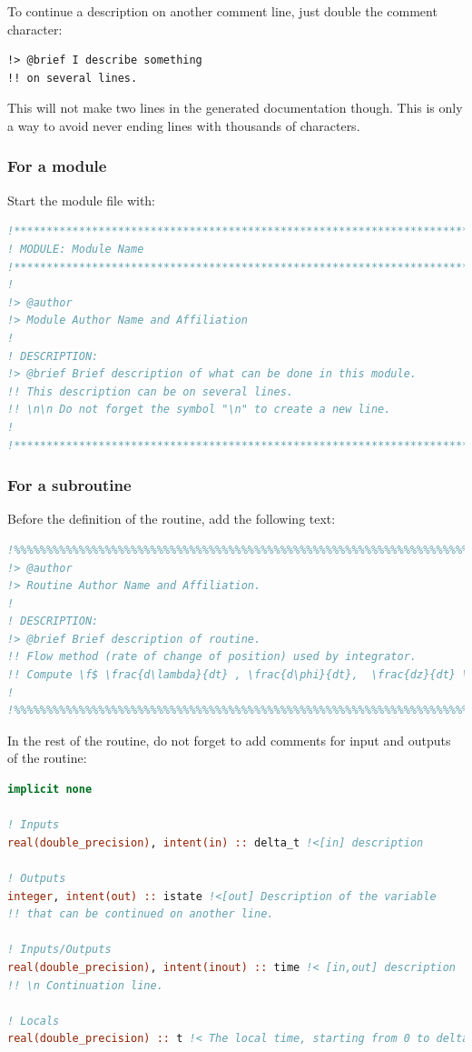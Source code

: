 \documentclass[english,a4paper,twoside]{article}
\begin{document}
To continue a description on another comment line, just double the comment character:
\begin{verbatim}
!> @brief I describe something
!! on several lines.
\end{verbatim}

\begin{remarque}
This will not make two lines in the generated documentation though. This is only a way to avoid never ending lines with thousands of characters.
\end{remarque}


\subsubsection{For a module}
Start the module file with:
\begin{lstlisting}[language=Fortran]
!******************************************************************************
! MODULE: Module Name
!******************************************************************************
!
!> @author
!> Module Author Name and Affiliation
!
! DESCRIPTION: 
!> @brief Brief description of what can be done in this module. 
!! This description can be on several lines. 
!! \n\n Do not forget the symbol "\n" to create a new line.
!
!******************************************************************************
\end{lstlisting}

\subsubsection{For a subroutine}
Before the definition of the routine, add the following text:
\begin{lstlisting}[language=Fortran]
!%%%%%%%%%%%%%%%%%%%%%%%%%%%%%%%%%%%%%%%%%%%%%%%%%%%%%%%%%%%%%%%%%%%%%%%%%%%
!> @author 
!> Routine Author Name and Affiliation.
!
! DESCRIPTION: 
!> @brief Brief description of routine. 
!! Flow method (rate of change of position) used by integrator.
!! Compute \f$ \frac{d\lambda}{dt} , \frac{d\phi}{dt},  \frac{dz}{dt} \f$ }
!
!%%%%%%%%%%%%%%%%%%%%%%%%%%%%%%%%%%%%%%%%%%%%%%%%%%%%%%%%%%%%%%%%%%%%%%%%%%% 
\end{lstlisting}

In the rest of the routine, do not forget to add comments for input and outputs of the routine: 
\begin{lstlisting}[language=Fortran]
implicit none

! Inputs
real(double_precision), intent(in) :: delta_t !<[in] description

! Outputs
integer, intent(out) :: istate !<[out] Description of the variable
!! that can be continued on another line.

! Inputs/Outputs
real(double_precision), intent(inout) :: time !< [in,out] description
!! \n Continuation line. 

! Locals
real(double_precision) :: t !< The local time, starting from 0 to delta_t
\end{lstlisting}
\end{document}
